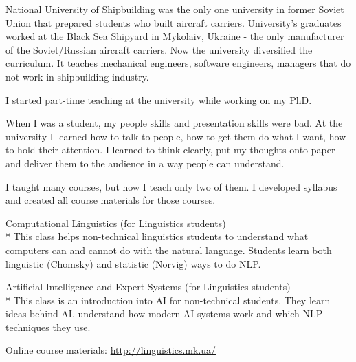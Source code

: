 \documentclass[12pt]{letter}
\begin{document}
\begin{llist}
  \startexperience

            \item National University of Shipbuilding was the only one university in former Soviet Union that prepared students who built aircraft carriers. University's graduates worked at the Black Sea Shipyard in Mykolaiv, Ukraine - the only manufacturer of the Soviet/Russian aircraft carriers. Now the university diversified the curriculum. It teaches mechanical engineers, software engineers, managers that do not work in shipbuilding industry.

            \item I started part-time teaching at the university while working on my PhD.

            \item When I was a student, my people skills and presentation skills were bad. At the university I learned how to talk to people, how to get them do what I want, how to hold their attention. I learned to think clearly, put my thoughts onto paper and deliver them to the audience in a way people can understand.

            \item I taught many courses, but now I teach only two of them. I developed syllabus and created all course materials for those courses.

            \item Computational Linguistics (for Linguistics students)\\*
            This class helps non-technical linguistics students to understand what computers can and cannot do with the natural language. Students learn both linguistic (Chomsky) and statistic (Norvig) ways to do NLP.

            \item Artificial Intelligence and Expert Systems (for Linguistics students)\\*
            This class is an introduction into AI for non-technical students. They learn ideas behind AI, understand how modern AI systems work and which NLP techniques they use.

            \item Online course materials: \url{http://linguistics.mk.ua/}

  \endexperience





\end{llist}
\end{document}
